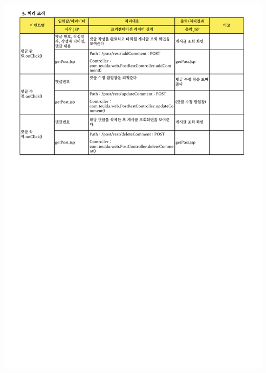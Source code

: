 {{{{{{{{{{{{{{{{{{{{{{{{{{{{{{{{{{{{{{{{{{{{{{{{{{{{{{{{{{{{{{{{\includegraphics[width=20cm]{./Figure/Design/Display/post/post_12.pdf} \\
}}}}}}}}}}}}}}}}}}}}}}}}}}}}}}}}}}}}}}}}}}}}}}}}}}}}}}}}}}}}}}}}
